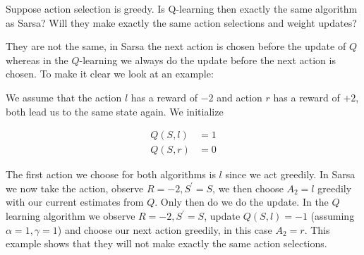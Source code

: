 
\begin{exercise}

Suppose action selection is greedy. Is Q-learning then exactly the same algorithm as Sarsa? Will they make exactly the same action selections and weight updates?

\end{exercise}


\begin{solution}

They are not the same, in Sarsa the next action is chosen before the update of $Q$ whereas in the $Q$-learning we always do the update before the next action is chosen. To make it clear we look at an example:

\begin{center}
\end{center}

We assume that the action $l$ has a reward of $-2$ and action $r$ has a reward of $+2$, both lead us to the same state again. We initialize

\begin{align*}
  Q(S,l) &= 1 \\
  Q(S,r) &= 0
\end{align*}

The first action we choose for both algorithms is $l$ since we act greedily. In Sarsa we now take the action, observe $R = -2, S^\prime =S$, we then choose $A_2 = l$ greedily with our current estimates from $Q$. Only then do we do the update. In the $Q$ learning algorithm we observe $R = -2, S^\prime =S$, update $Q(S,l) = -1$ (assuming $\alpha = 1, \gamma = 1$) and choose our next action greedily, in this case $A_2 = r$.
This example shows that they will not make exactly the same action selections.
\end{solution}

